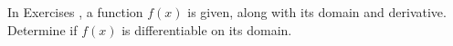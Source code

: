 {\noindent In Exercises}
{, a function $f(x)$ is given, along with its domain and derivative. Determine if $f(x)$ is differentiable on its domain.
}
